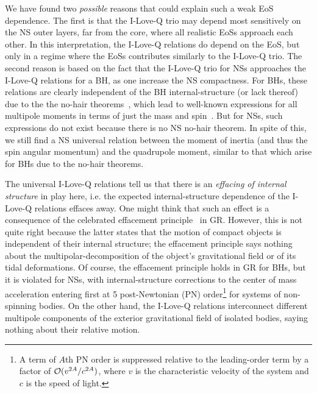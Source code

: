 \documentclass[aps,twocolumn,nofootinbib,showpacs,superscriptaddress,hyperref]{revtex4-1}
\begin{document}
We have found two {\emph{possible}} reasons that could explain such a weak EoS dependence. The first is that the I-Love-Q trio may depend most sensitively on the NS outer layers, far from the core, where all realistic EoSs approach each other. In this interpretation, the I-Love-Q relations do depend on the EoS, but only in a regime where the EoSs contributes similarly to the I-Love-Q trio. The second reason is based on the fact that the I-Love-Q trio for NSs approaches the I-Love-Q relations for a BH, as one increase the NS compactness. For BHs, these relations are clearly independent of the BH internal-structure (or lack thereof) due to the the no-hair theorems~\cite{robinson,israel,israel2,hawking-uniqueness0,hawking-uniqueness,carter-uniqueness}, which lead to well-known expressions for all multipole moments in terms of just the mass and spin~\cite{geroch,hansen}. But for NSs, such expressions do not exist because there is no NS no-hair theorem. In spite of this, we still find a NS universal relation between the moment of inertia (and thus the spin angular momentum) and the quadrupole moment, similar to that which arise for BHs due to the no-hair theorems. 

The universal I-Love-Q relations tell us that there is an {\emph{effacing of internal structure}} in play here, i.e. the expected internal-structure dependence of the I-Love-Q relations effaces away. One might think that such an effect is a consequence of the celebrated effacement principle~\cite{damour-effacement} in GR. However, this is not quite right because the latter states that the motion of compact objects is independent of their internal structure; the effacement principle says nothing about the multipolar-decomposition of the object's gravitational field or of its tidal deformations. Of course, the effacement principle holds in GR for BHs, but it is violated for NSs, with internal-structure corrections to the center of mass acceleration entering first at 5 post-Newtonian (PN) order\footnote{A term of $A$th PN order is suppressed relative to the leading-order term by a factor of ${\cal{O}}(v^{2A}/c^{2A})$, where $v$ is the characteristic velocity of the system and $c$ is the speed of light.} for systems of non-spinning bodies. On the other hand, the I-Love-Q relations interconnect different multipole components of the exterior gravitational field of isolated bodies, saying nothing about their relative motion. 
\end{document}

